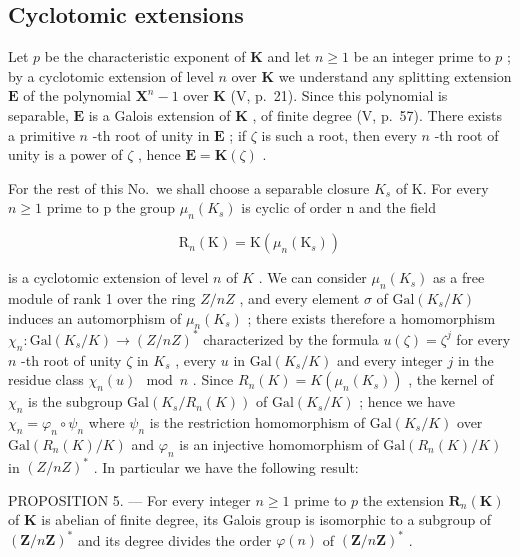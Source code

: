 \subsection{Cyclotomic extensions}

Let \(p\) be the characteristic exponent of \(\mathbf{K}\) and let \(n \geqslant 1\) be an integer prime to \(p\) ; by a cyclotomic extension of level \(n\) over \(\mathbf{K}\) we understand any splitting extension \(\mathbf{E}\) of the polynomial \(\mathbf{X}^n - 1\) over \(\mathbf{K}\) (V, p.~21). Since this polynomial is separable, \(\mathbf{E}\) is a Galois extension of \(\mathbf{K}\) , of finite degree (V, p.~57). There exists a primitive \(n\) -th root of unity in \(\mathbf{E}\) ; if \(\zeta\) is such a root, then every \(n\) -th root of unity is a power of \(\zeta\) , hence \(\mathbf{E} = \mathbf{K}(\zeta)\) .

For the rest of this No.~we shall choose a separable closure \(K_{s}\) of K. For every \(n \geqslant 1\) prime to p the group \(\mu_{n}(K_{s})\) is cyclic of order n and the field

\[
\mathrm{R} _ {n} (\mathrm{K}) = \mathrm{K} \left(\mu_ {n} \left(\mathrm{K} _ {s}\right)\right)
\]

is a cyclotomic extension of level \(n\) of \(K\) . We can consider \(\mu_n(K_s)\) as a free module of rank 1 over the ring \(Z/nZ\) , and every element \(\sigma\) of \(\text{Gal}(K_s/K)\) induces an automorphism of \(\mu_n(K_s)\) ; there exists therefore a homomorphism \(\chi_n: \text{Gal}(K_s/K) \to (Z/nZ)^*\) characterized by the formula \(u(\zeta) = \zeta^j\) for every \(n\) -th root of unity \(\zeta\) in \(K_s\) , every \(u\) in \(\text{Gal}(K_s/K)\) and every integer \(j\) in the residue class \(\chi_n(u) \mod n\) . Since \(R_n(K) = K(\mu_n(K_s))\) , the kernel of \(\chi_n\) is the subgroup \(\text{Gal}(K_s/R_n(K))\) of \(\text{Gal}(K_s/K)\) ; hence we have \(\chi_n = \varphi_n \circ \psi_n\) where \(\psi_n\) is the restriction homomorphism of \(\text{Gal}(K_s/K)\) over \(\text{Gal}(R_n(K)/K)\) and \(\varphi_n\) is an injective homomorphism of \(\text{Gal}(R_n(K)/K)\) in \((Z/nZ)^*\) . In particular we have the following result:

PROPOSITION 5. --- For every integer \(n \geqslant 1\) prime to \(p\) the extension \(\mathbf{R}_n(\mathbf{K})\) of \(\mathbf{K}\) is abelian of finite degree, its Galois group is isomorphic to a subgroup of \((\mathbf{Z}/n\mathbf{Z})^*\) and its degree divides the order \(\varphi(n)\) of \((\mathbf{Z}/n\mathbf{Z})^*\) .

